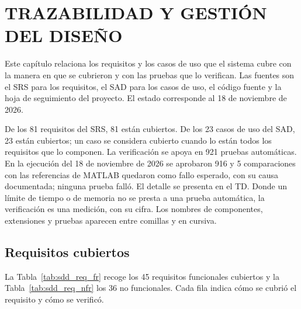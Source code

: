 \documentclass[12pt,letterpaper,oneside]{article}
\DeclareRobustCommand{\_}{\textunderscore\allowbreak}
\newcommand{\capitulo}[1]{\clearpage\section{#1}}
\begin{document}
\capitulo{TRAZABILIDAD Y GESTIÓN DEL DISEÑO}
\label{sec:sdd_trazabilidad}

Este capítulo relaciona los requisitos y los casos de uso que el sistema cubre con la manera en que se cubrieron y con las pruebas que lo verifican. Las fuentes son el SRS para los requisitos, el SAD para los casos de uso, el código fuente y la hoja de seguimiento del proyecto. El estado corresponde al 18 de noviembre de 2026.

De los 81 requisitos del SRS, 81 están cubiertos. De los 23 casos de uso del SAD, 23 están cubiertos; un caso se considera cubierto cuando lo están todos los requisitos que lo componen. La verificación se apoya en 921 pruebas automáticas. En la ejecución del 18 de noviembre de 2026 se aprobaron 916 y 5 comparaciones con las referencias de MATLAB quedaron como fallo esperado, con su causa documentada; ninguna prueba falló. El detalle se presenta en el TD. Donde un límite de tiempo o de memoria no se presta a una prueba automática, la verificación es una medición, con su cifra. Los nombres de componentes, extensiones y pruebas aparecen entre comillas y en cursiva.

\subsection{Requisitos cubiertos}
\label{sec:sdd_req_cubiertos}

La Tabla~\ref{tab:sdd_req_fr} recoge los 45 requisitos funcionales cubiertos y la Tabla~\ref{tab:sdd_req_nfr} los 36 no funcionales. Cada fila indica cómo se cubrió el requisito y cómo se verificó.
\end{document}
